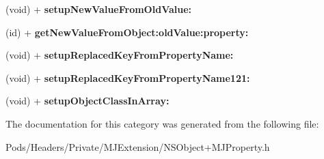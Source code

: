 \begin{DoxyCompactItemize}
(void) + {\bfseries setup\+New\+Value\+From\+Old\+Value\+:}
\item 
\mbox{\label{category_n_s_object_07_m_j_property_deprecated__v__2__5__16_08_aeeb4d7f967304a42199487531aeb9b2e}} 
(id) + {\bfseries get\+New\+Value\+From\+Object\+:old\+Value\+:property\+:}
\item 
\mbox{\label{category_n_s_object_07_m_j_property_deprecated__v__2__5__16_08_ac4c5c84c6701cafc2ec95eeb301dbdee}} 
(void) + {\bfseries setup\+Replaced\+Key\+From\+Property\+Name\+:}
\item 
\mbox{\label{category_n_s_object_07_m_j_property_deprecated__v__2__5__16_08_a0e24cefd9caa4f9785a14a57a4066d61}} 
(void) + {\bfseries setup\+Replaced\+Key\+From\+Property\+Name121\+:}
\item 
\mbox{\label{category_n_s_object_07_m_j_property_deprecated__v__2__5__16_08_af5e81ac5bfae0451e3c319f99a413e65}} 
(void) + {\bfseries setup\+Object\+Class\+In\+Array\+:}
\end{DoxyCompactItemize}


The documentation for this category was generated from the following file\+:\begin{DoxyCompactItemize}
\item 
Pods/\+Headers/\+Private/\+M\+J\+Extension/N\+S\+Object+\+M\+J\+Property.\+h\end{DoxyCompactItemize}
